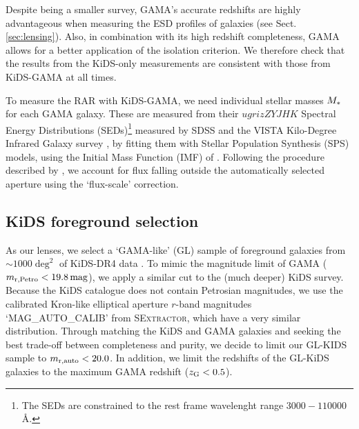 \documentclass[usenatbib]{mnras}
\newcommand{\magn}{\, {\rm mag} }
\newcommand{\un}[1]{_{\rm #1}}
\begin{document}
Despite being a smaller survey, GAMA's accurate redshifts are highly advantageous when measuring the ESD profiles of galaxies (see Sect. \ref{sec:lensing}). Also, in combination with its high redshift completeness, GAMA allows for a better application of the isolation criterion. We therefore check that the results from the KiDS-only measurements are consistent with those from KiDS-GAMA at all times.

To measure the RAR with KiDS-GAMA, we need individual stellar masses $M\un{*}$ for each GAMA galaxy. These are measured from their $ugrizZYJHK$ Spectral Energy Distributions (SEDs)\footnote{The SEDs are constrained to the rest frame wavelenght range $3000-110000$ \AA.} measured by SDSS and the VISTA Kilo-Degree Infrared Galaxy survey \cite[VIKING,][]{edge2013}, by fitting them with \cite{bruzual2003} Stellar Population Synthesis (SPS) models, using the Initial Mass Function (IMF) of \cite{chabrier2003}. Following the procedure described by \cite{taylor2011}, we account for flux falling outside the automatically selected aperture using the `flux-scale' correction.

\subsection{KiDS foreground selection}
\label{sec:gamalike_kids}

As our lenses, we select a `GAMA-like' (GL) sample of foreground galaxies from $\sim1000 \deg^2$ of KiDS-DR4 data \cite[]{kuijken2019}. To mimic the magnitude limit of GAMA ($m\un{r,Petro}<19.8 \magn$), we apply a similar cut to the (much deeper) KiDS survey. Because the KiDS catalogue does not contain Petrosian magnitudes, we use the calibrated Kron-like elliptical aperture $r$-band magnitudes `MAG\_AUTO\_CALIB' from \textsc{SExtractor}, which have a very similar distribution. Through matching the KiDS and GAMA galaxies and seeking the best trade-off between completeness and purity, we decide to limit our GL-KIDS sample to $m\un{r,auto}<20.0$. In addition, we limit the redshifts of the GL-KiDS galaxies to the maximum GAMA redshift ($z\un{G}<0.5$).
\end{document}
